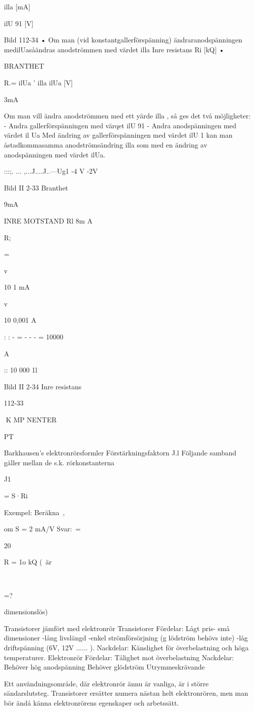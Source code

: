 illa [mA]

ilU 91 [V]

Bild 112-34
• Om man (vid konstantgallerförspänning)
ändraranodspänningen medilUasåändras anodströmmen med värdet illa
Inre resistans
Ri [kQ]
•

BRANTHET

R.= ilUa
' illa
ilUa [V]

3mA

Om man vill ändra anodströmmen med
ett yärde illa , så ges det två möjligheter:
- Andra gallerförspänningen med värqet ilU 91
- Andra anodspänningen med värdet
il Ua
Med ändring av gallerförspänningen
med värdet ilU 1 kan man åstadkommasamma anodströmsändring illa som
med en ändring av anodspänningen
med värdet ilUa.

:::;. ... ,...J....J..---Ug1
-4 V
-2V

Bild II 2-33 Branthet

9mA

INRE MOTSTAND Rl
8m A

R;

=

v

10
1 mA

v

10
0,001 A

: : - = - - - = 10000

A

:: 10 000 1l

Bild II 2-34 Inre resistans

112-33

K MP NENTER

PT

Barkhausen's elektronrörsformler
Förstärkningsfaktorn J.l
Följande samband gäller mellan de s.k. rörkonstanterna

J1

= S·Ri

Exempel:
Beräkna~,

om S = 2 mA/V
Svar:~=

20

R = 1o kQ
(~är

~

=?

dimensionslös)

Transistorer jämfört med elektronrör
Transistorer
Fördelar:
Lågt pris- små dimensioner -lång livslängd
-enkel strömförsörjning (g lödström behövs
inte) -låg driftspänning (6V, 12V ...... ).
Nackdelar:
Känslighet för överbelastning och höga
temperaturer.
Elektronrör
Fördelar:
Tålighet mot överbelastning
Nackdelar:
Behöver hög anodspänning
Behöver glödström
Utrymmeskrävande

Ett användningsområde, där elektronrör
ännu är vanliga, är i större sändarslutsteg.
Transistorer ersätter numera nästan helt
elektronrören, men man bör ändå känna
elektronrörens egenskaper och arbetssätt.
